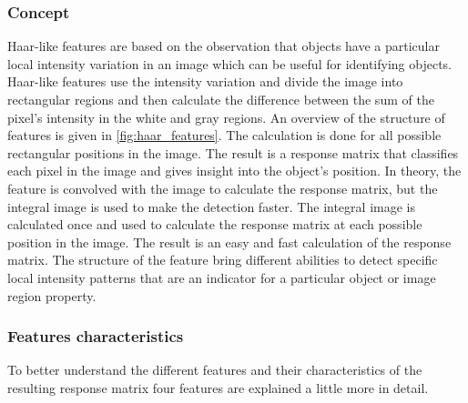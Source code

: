 \subsubsection{Concept }
Haar-like features \cite{viola_rapid_nodate} are based on the observation that objects have a particular local intensity variation in an image which can be useful for identifying objects. Haar-like features use the intensity variation and divide the image into rectangular regions and then calculate the difference between the sum of the pixel's intensity in the white and gray regions. An overview of the structure of features is given in \ref{fig:haar_features}. The calculation is done for all possible rectangular positions in the image. The result is a response matrix that classifies each pixel in the image and gives insight into the object's position. In theory, the feature is convolved with the image to calculate the response matrix, but the integral image is used to make the detection faster. The integral image is calculated once and used to calculate the response matrix at each possible position in the image.
The result is an easy and fast calculation of the response matrix. 
The structure of the feature bring different abilities to detect specific local intensity patterns that are an indicator for a particular object or image region property. 
\subsubsection{Features characteristics}
To better understand the different features and their characteristics of the resulting response matrix four features are explained a little more in detail. 
